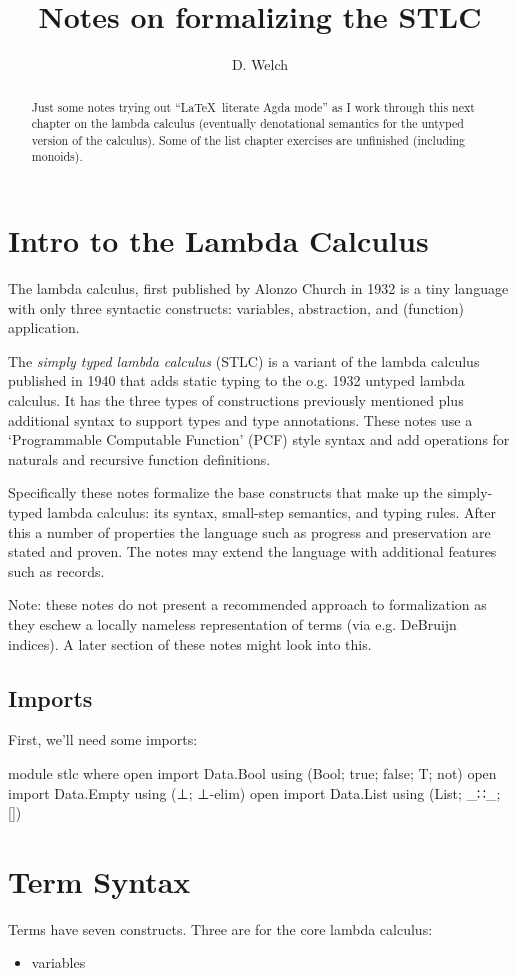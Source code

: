 \documentclass[runningheads]{llncs}
\begin{document}
\title{Notes on formalizing the STLC}
\author{D. Welch}
\institute{}
\maketitle

\begin{abstract}
Just some notes trying out ``\LaTeX \ literate Agda mode'' as I work through 
this next chapter on the lambda calculus (eventually denotational semantics for
the untyped version of the calculus). Some of the list chapter exercises are
unfinished (including monoids).
\end{abstract}

\section{Intro to the Lambda Calculus} 

The lambda calculus, first published by Alonzo Church in 1932 is a tiny language 
with only three syntactic constructs: variables, abstraction, and (function) 
application. 

The \textit{simply typed lambda calculus} (STLC) is a variant of the lambda 
calculus published in 1940 that adds static typing to the o.g. 1932 untyped 
lambda calculus. It has the three types of constructions previously mentioned 
plus additional syntax to support types and type annotations. These notes use a 
`Programmable Computable Function' (PCF) style syntax and add operations for 
naturals and recursive function definitions.

Specifically these notes formalize the base constructs that make up the 
simply-typed lambda calculus: its syntax, small-step semantics, and typing 
rules. After this a number of properties the language such as progress and 
preservation are stated and proven. The notes may extend the language with 
additional features such as records.

Note: these notes do not present a recommended approach to formalization as 
they eschew a locally nameless representation of terms (via e.g. DeBruijn 
indices). A later section of these notes might look into this. 

\subsection{Imports}

First, we'll need some imports:
\begin{code}
module stlc where 
open import Data.Bool using (Bool; true; false; T; not)
open import Data.Empty using (⊥; ⊥-elim)
open import Data.List using (List; _∷_; [])
\end{code}

\section{Term Syntax}

Terms have seven constructs. Three are for the core lambda calculus:
\begin{itemize}
\item variables 
\end{itemize}
\end{document}
